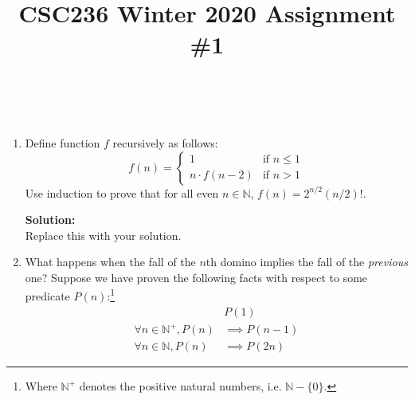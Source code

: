 \documentclass[boldsans]{article}
\title{CSC236 Winter 2020 Assignment \#1}
\author{\name \\ \textit{\utorid}}
\newcommand{\N}{\mathbb{N}}
\newenvironment{solution}
{\bigskip \noindent \textbf{Solution: \\}}
{}
\begin{document}
\maketitle

\begin{enumerate}

\item Define function $f$ recursively as follows:
\begin{equation*}
    f(n) =
    \begin{cases}
      1 & \text{if } n \leq 1 \\
      n \cdot f(n-2) & \text{if } n > 1
    \end{cases}
  \end{equation*}
Use induction to prove that for all even $n \in \N$, $f(n) = 2^{n/2} (n/2)!$.

\begin{solution}
Replace this with your solution.
\end{solution}

\newpage
\item What happens when the fall of the $n$th domino implies the fall of the \textit{previous} one? Suppose we have proven the following facts with respect to some predicate $P(n)$:\footnote{Where $\N^+$ denotes the positive natural numbers, i.e. $\N - \{0\}$.}
\begin{align}
    &P(1) \label{basis} \\
    \forall n \in \N^+, P(n) &\implies P(n-1) \label{back}\\
    \forall n \in \N, P(n) &\implies P(2n) \label{double}
\end{align}


\end{enumerate}
\end{document}
